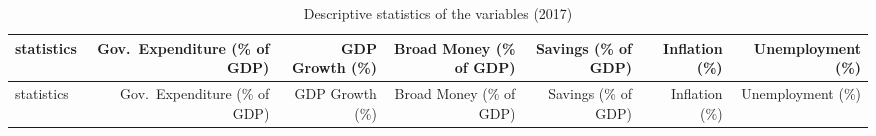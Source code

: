 \documentclass[
]{article}
\begin{document}
\begin{longtable}[]{@{}lrrrrrr@{}}
\caption{Descriptive statistics of the variables (2017)}\tabularnewline
\toprule
\begin{minipage}[b]{0.07\columnwidth}\raggedright
statistics\strut
\end{minipage} & \begin{minipage}[b]{0.18\columnwidth}\raggedleft
Gov.~Expenditure (\% of GDP)\strut
\end{minipage} & \begin{minipage}[b]{0.10\columnwidth}\raggedleft
GDP Growth (\%)\strut
\end{minipage} & \begin{minipage}[b]{0.15\columnwidth}\raggedleft
Broad Money (\% of GDP)\strut
\end{minipage} & \begin{minipage}[b]{0.12\columnwidth}\raggedleft
Savings (\% of GDP)\strut
\end{minipage} & \begin{minipage}[b]{0.09\columnwidth}\raggedleft
Inflation (\%)\strut
\end{minipage} & \begin{minipage}[b]{0.11\columnwidth}\raggedleft
Unemployment (\%)\strut
\end{minipage}\tabularnewline
\midrule
\endfirsthead
\toprule
\begin{minipage}[b]{0.07\columnwidth}\raggedright
statistics\strut
\end{minipage} & \begin{minipage}[b]{0.18\columnwidth}\raggedleft
Gov.~Expenditure (\% of GDP)\strut
\end{minipage} & \begin{minipage}[b]{0.10\columnwidth}\raggedleft
GDP Growth (\%)\strut
\end{minipage} & \begin{minipage}[b]{0.15\columnwidth}\raggedleft
Broad Money (\% of GDP)\strut
\end{minipage} & \begin{minipage}[b]{0.12\columnwidth}\raggedleft
Savings (\% of GDP)\strut
\end{minipage} & \begin{minipage}[b]{0.09\columnwidth}\raggedleft
Inflation (\%)\strut
\end{minipage} & \begin{minipage}[b]{0.11\columnwidth}\raggedleft
Unemployment (\%)\strut
\end{minipage}\tabularnewline

\end{longtable}
\end{document}
